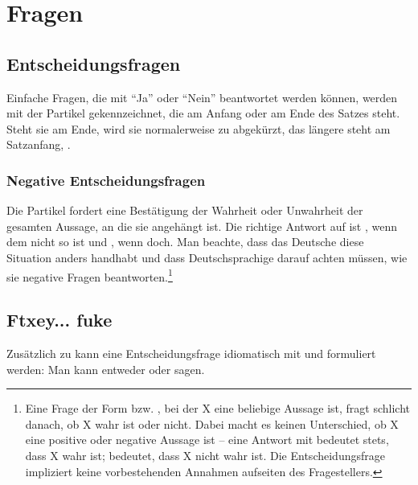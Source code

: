 \section{Fragen}
\subsection{Entscheidungsfragen} 
Einfache Fragen, die mit ``Ja'' oder ``Nein'' beantwortet werden können, werden mit der Partikel  gekennzeichnet, die am Anfang oder am Ende des Satzes steht. Steht sie am Ende, wird sie normalerweise zu  abgekürzt, das längere  steht am Satzanfang,  .

\subsubsection{Negative Entscheidungsfragen} 
Die Partikel  fordert eine Bestätigung der Wahrheit oder Unwahrheit der gesamten Aussage, an die sie angehängt ist. Die richtige Antwort auf   ist , wenn dem nicht so ist und , wenn doch. Man beachte, dass das Deutsche diese Situation anders handhabt und dass Deutschsprachige darauf achten müssen, wie sie negative Fragen beantworten.\footnote{Eine Frage der Form  bzw. , bei der X eine beliebige Aussage ist, fragt schlicht danach, ob X wahr ist oder nicht. Dabei macht es keinen Unterschied, ob X eine positive oder negative Aussage ist -- eine Antwort mit  bedeutet stets, dass X wahr ist;  bedeutet, dass X nicht wahr ist. Die Entscheidungsfrage impliziert keine vorbestehenden Annahmen aufseiten des Fragestellers.} 

\subsection{Ftxey... fuke} Zusätzlich zu  kann eine Entscheidungsfrage idiomatisch mit   und   formuliert werden: Man kann entweder   oder   sagen.
\label{syn:question:ftxey}

